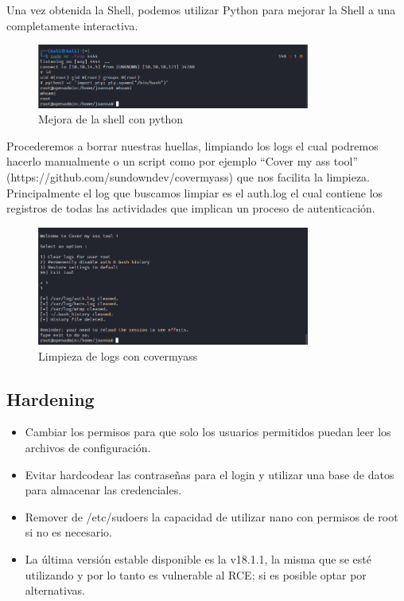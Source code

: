 \documentclass{article}
\begin{document}
Una vez obtenida la Shell, podemos utilizar Python para mejorar la Shell a una completamente interactiva.
\begin{figure}[H]
	\center
	\includegraphics[width=0.8\textwidth]{images/openadmin/22-conexionreverse}
	\caption{Mejora de la shell con python}
\end{figure}

Procederemos a borrar nuestras huellas, limpiando los logs el cual podremos hacerlo manualmente o un script como por ejemplo “Cover my ass tool” (https://github.com/sundowndev/covermyass) que nos facilita la limpieza. Principalmente el log que buscamos limpiar es el auth.log el cual contiene los registros de todas las actividades que implican un proceso de autenticación.
\begin{figure}[H]
	\center
	\includegraphics[width=0.8\textwidth]{images/openadmin/23-covermyass}
	\caption{Limpieza de logs con covermyass}
\end{figure}

\subsection{Hardening}
\begin{itemize}
	\item Cambiar los permisos para que solo los usuarios permitidos puedan leer los archivos de configuración.
	\item Evitar hardcodear las contraseñas para el login y utilizar una base de datos para almacenar las credenciales.
	\item Remover de /etc/sudoers la capacidad de utilizar nano con permisos de root si no es necesario.
	\item La última versión estable disponible es la v18.1.1, la misma que se esté utilizando y por lo tanto es vulnerable al RCE; si es posible optar por alternativas.
\end{itemize}
\end{document}
